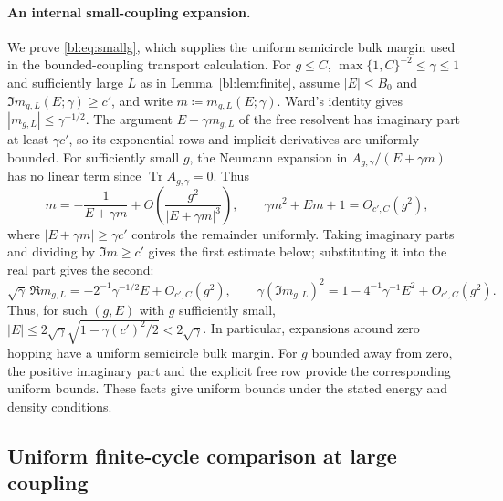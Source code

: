 \documentclass[11pt]{article}
\numberwithin{equation}{section}
\theoremstyle{remark}
\newcommand{\Tr}{\operatorname{Tr}}
\begin{document}
\paragraph{An internal small-coupling expansion.}
We prove \eqref{bl:eq:smallg}, which supplies the uniform semicircle
bulk margin used in the bounded-coupling transport calculation.
For $g\le C$, $\max\{1,C\}^{-2}\le\gamma\le1$ and sufficiently
large $L$ as in Lemma~\ref{bl:lem:finite}, assume $|E|\le B_0$ and
$\Im m_{g,L}(E;\gamma)\ge c'$, and write
$m\coloneqq m_{g,L}(E;\gamma)$. Ward's identity gives \(|m_{g,L}|\le\gamma^{-1/2}\).
The argument \(E+\gamma m_{g,L}\) of the free resolvent has imaginary part
at least \(\gamma c'\), so its exponential rows and implicit derivatives are
uniformly bounded. For sufficiently small $g$, the Neumann expansion
in $A_{g,\gamma}/(E+\gamma m)$ has no linear term since $\Tr A_{g,\gamma}=0$. Thus
\[
 m=-\frac1{E+\gamma m}
      +O\!\left(\frac{g^2}{|E+\gamma m|^3}\right),\qquad
 \gamma m^2+Em+1=O_{c',C}(g^2),
\]
where $|E+\gamma m|\ge\gamma c'$ controls the remainder uniformly.
Taking imaginary parts and dividing by $\Im m\ge c'$ gives the first
estimate below; substituting it into the real part gives the second:
\begin{equation}\label{bl:eq:smallg}
  \sqrt\gamma\,\Re m_{g,L}=-2^{-1}\gamma^{-1/2} E+O_{c',C}(g^2),\qquad
 \gamma(\Im m_{g,L})^2=1-4^{-1}\gamma^{-1} E^2+O_{c',C}(g^2).
\end{equation}
Thus, for such $(g,E)$ with \(g\) sufficiently small,
\(|E|\le2\sqrt\gamma\sqrt{1-\gamma (c')^2/2}<2\sqrt\gamma\). In particular, expansions around
zero hopping have a uniform semicircle bulk margin. For \(g\) bounded
away from zero, the positive imaginary part and the explicit free row
provide the corresponding uniform bounds. These facts give uniform bounds under the stated energy and
density conditions.

\subsection{Uniform finite-cycle comparison at large coupling}
\label{app:uniform-finite-comparison}
\end{document}
